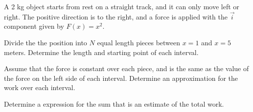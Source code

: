 \begin{problem}
  \item A 2 kg object starts from rest on a straight track, and it can
    only move left or right. The positive direction is to the right, and
    a force is applied with the $\vec{i}$ component given by $F(x)=x^2$.




    \begin{subproblem}
      \item Divide the the position into $N$ equal length pieces between $x=1$ and $x=5$ meters. Determine the length and starting point of each interval.
      \vspace{4em}
      \item Assume that the force is constant over each piece, and is the same as the value of the force on the left side of each interval.
      Determine an approximation for the work over each interval.
      \vfill
      \item Determine a expression for the sum that is an estimate of the total work.
        \vfill
    \end{subproblem}

\end{problem}


\postClass

